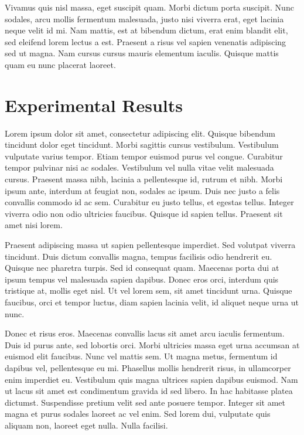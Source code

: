 \documentclass[12pt]{report}
\begin{document}
Vivamus quis nisl massa, eget suscipit quam. Morbi dictum porta suscipit. Nunc sodales, arcu mollis fermentum malesuada, justo nisi viverra erat, eget lacinia neque velit id mi. Nam mattis, est at bibendum dictum, erat enim blandit elit, sed eleifend lorem lectus a est. Praesent a risus vel sapien venenatis adipiscing sed ut magna. Nam cursus cursus mauris elementum iaculis. Quisque mattis quam eu nunc placerat laoreet.


\chapter{Experimental Results}\label{chap:experimental_results}
Lorem ipsum dolor sit amet, consectetur adipiscing elit. Quisque bibendum tincidunt dolor eget tincidunt. Morbi sagittis cursus vestibulum. Vestibulum vulputate varius tempor. Etiam tempor euismod purus vel congue. Curabitur tempor pulvinar nisi ac sodales. Vestibulum vel nulla vitae velit malesuada cursus. Praesent massa nibh, lacinia a pellentesque id, rutrum et nibh. Morbi ipsum ante, interdum at feugiat non, sodales ac ipsum. Duis nec justo a felis convallis commodo id ac sem. Curabitur eu justo tellus, et egestas tellus. Integer viverra odio non odio ultricies faucibus. Quisque id sapien tellus. Praesent sit amet nisi lorem.

Praesent adipiscing massa ut sapien pellentesque imperdiet. Sed volutpat viverra tincidunt. Duis dictum convallis magna, tempus facilisis odio hendrerit eu. Quisque nec pharetra turpis. Sed id consequat quam. Maecenas porta dui at ipsum tempus vel malesuada sapien dapibus. Donec eros orci, interdum quis tristique at, mollis eget nisl. Ut vel lorem sem, sit amet tincidunt urna. Quisque faucibus, orci et tempor luctus, diam sapien lacinia velit, id aliquet neque urna ut nunc.

Donec et risus eros. Maecenas convallis lacus sit amet arcu iaculis fermentum. Duis id purus ante, sed lobortis orci. Morbi ultricies massa eget urna accumsan at euismod elit faucibus. Nunc vel mattis sem. Ut magna metus, fermentum id dapibus vel, pellentesque eu mi. Phasellus mollis hendrerit risus, in ullamcorper enim imperdiet eu. Vestibulum quis magna ultrices sapien dapibus euismod. Nam ut lacus sit amet est condimentum gravida id sed libero. In hac habitasse platea dictumst. Suspendisse pretium velit sed ante posuere tempor. Integer sit amet magna et purus sodales laoreet ac vel enim. Sed lorem dui, vulputate quis aliquam non, laoreet eget nulla. Nulla facilisi.
\end{document}
